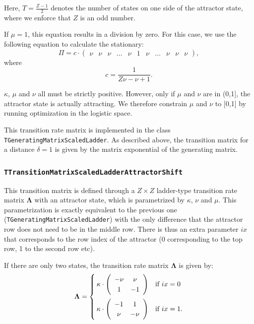 \documentclass[a4paper,11pt]{article}
\def\bLambda{\boldsymbol{\Lambda}}
\newcommand{\class}[1]{\texttt{#1}}
\begin{document}
Here, $T = \frac{Z-1}{2} $ denotes the number of states on one side of the attractor state, where we enforce that $Z$ is an odd number.

If $\mu = 1$, this equation results in a division by zero. For this case, we use the following equation to calculate the stationary:
\begin{equation*}
  \Pi = c \cdot \left(\begin{array}{cccccccccccc}
  \nu  & \nu & \nu & \ldots & \nu & 1 & \nu & \ldots & \nu & \nu & \nu
\end{array}\right),
\end{equation*}
where
\begin{equation*}
  c = \frac{1}{Z\nu - \nu + 1}.
\end{equation*}

$\kappa$, $\mu$ and $\nu$ all must be strictly positive. However, only if $\mu$ and $\nu$ are in (0,1], the attractor state is actually attracting. We therefore constrain $\mu$ and $\nu$ to [0,1] by running optimization in the logistic space.

This transition rate matrix is implemented in the class \class{TGeneratingMatrixScaledLadder}. As described above, the transition matrix for a distance $\delta = 1$ is given by the matrix exponential of the generating matrix.

\subsubsection{\class{TTransitionMatrixScaledLadderAttractorShift}}
This transition matrix is defined through a $Z \times Z$ ladder-type transition rate matrix $\bLambda$ with an attractor state, which is parametrized by $\kappa$, $\nu$ and $\mu$. This parametrization is exactly equivalent to the previous one (\class{TGeneratingMatrixScaledLadder}) with the only difference that the attractor row does not need to be in the middle row. There is thus an extra parameter $ix$ that corresponds to the row index of the attractor (0 corresponding to the top row, 1 to the second row etc).

If there are only two states, the transition rate matrix $\bLambda$ is given by:
    \begin{equation*}
    \bLambda = \begin{cases}
    \kappa \cdot  \left(\begin{array}{cc}
    -\nu & \nu \\
    1 & -1
    \end{array}\right)  & \mbox{if } ix = 0 \vspace{0.2cm}\\

    \kappa \cdot  \left(\begin{array}{cc}
    -1 & 1 \\
    \nu & -\nu
    \end{array}\right) & \mbox{if } ix = 1.
    \end{cases}
    \end{equation*}
\end{document}
